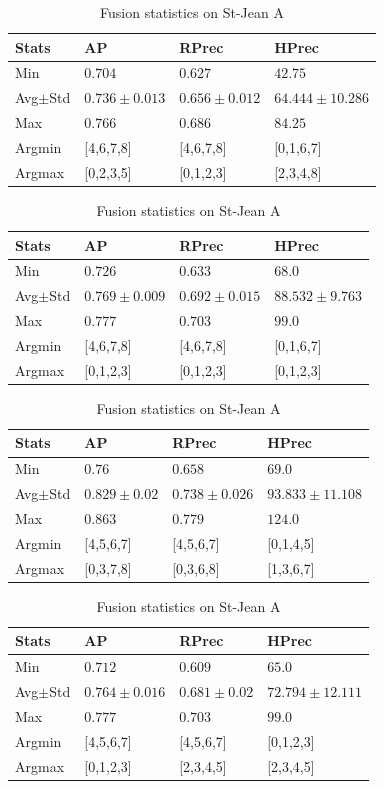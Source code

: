 \begin{table}
  \centering
  \caption{Fusion statistics on St-Jean A}
  \label{tab:fusion_stats_A_B}

  \begin{tabular}{l l l l}
    \toprule
    Stats
    & AP
    & RPrec
    & HPrec \\
    \midrule
    Min & $0.704$ & $0.627$ & $42.75$ \\
    Avg$\pm$Std & $0.736\pm0.013$ & $0.656\pm0.012$ & $64.444\pm10.286$ \\
    Max & $0.766$ & $0.686$ & $84.25$ \\
    Argmin & [4,6,7,8] & [4,6,7,8] & [0,1,6,7] \\
    Argmax & [0,2,3,5] & [0,1,2,3] & [2,3,4,8] \\
    \bottomrule
  \end{tabular}

  \begin{tabular}{l l l l}
    \toprule
    Stats
    & AP
    & RPrec
    & HPrec \\
    \midrule
    Min & $0.726$ & $0.633$ & $68.0$ \\
    Avg$\pm$Std & $0.769\pm0.009$ & $0.692\pm0.015$ & $88.532\pm9.763$ \\
    Max & $0.777$ & $0.703$ & $99.0$ \\
    Argmin & [4,6,7,8] & [4,6,7,8] & [0,1,6,7] \\
    Argmax & [0,1,2,3] & [0,1,2,3] & [0,1,2,3] \\
    \bottomrule
  \end{tabular}

  \begin{tabular}{l l l l}
    \toprule
    Stats
    & AP
    & RPrec
    & HPrec \\
    \midrule
    Min & $0.76$ & $0.658$ & $69.0$ \\
    Avg$\pm$Std & $0.829\pm0.02$ & $0.738\pm0.026$ & $93.833\pm11.108$ \\
    Max & $0.863$ & $0.779$ & $124.0$ \\
    Argmin & [4,5,6,7] & [4,5,6,7] & [0,1,4,5] \\
    Argmax & [0,3,7,8] & [0,3,6,8] & [1,3,6,7] \\
    \bottomrule
  \end{tabular}

  \begin{tabular}{l l l l}
    \toprule
    Stats
    & AP
    & RPrec
    & HPrec \\
    \midrule
    Min & $0.712$ & $0.609$ & $65.0$ \\
    Avg$\pm$Std & $0.764\pm0.016$ & $0.681\pm0.02$ & $72.794\pm12.111$ \\
    Max & $0.777$ & $0.703$ & $99.0$ \\
    Argmin & [4,5,6,7] & [4,5,6,7] & [0,1,2,3] \\
    Argmax & [0,1,2,3] & [2,3,4,5] & [2,3,4,5] \\
    \bottomrule
  \end{tabular}
\end{table}

